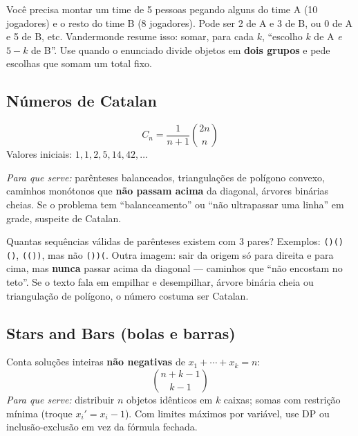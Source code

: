 \begin{exemplodiabox}
Você precisa montar um time de 5 pessoas pegando alguns do time A (10 jogadores) e o resto do time B (8 jogadores). Pode ser 2 de A e 3 de B, ou 0 de A e 5 de B, etc. Vandermonde resume isso: somar, para cada $k$, ``escolho $k$ de A \emph{e} $5-k$ de B''. Use quando o enunciado divide objetos em \textbf{dois grupos} e pede escolhas que somam um total fixo.
\end{exemplodiabox}



\subsection{Números de Catalan}

\begin{equation}
  C_n = \frac{1}{n+1}\binom{2n}{n}
\end{equation}
Valores iniciais: $1, 1, 2, 5, 14, 42, \ldots$

\emph{Para que serve:} parênteses balanceados, triangulações de polígono convexo, caminhos monótonos que \textbf{não passam acima} da diagonal, árvores binárias cheias.
Se o problema tem ``balanceamento'' ou ``não ultrapassar uma linha'' em grade, suspeite de Catalan.

\begin{exemplodiabox}
Quantas sequências válidas de parênteses existem com 3 pares? Exemplos: \texttt{()()()}, \texttt{(())}, mas não \texttt{())(}. Outra imagem: sair da origem só para direita e para cima, mas \textbf{nunca} passar acima da diagonal --- caminhos que ``não encostam no teto''. Se o texto fala em empilhar e desempilhar, árvore binária cheia ou triangulação de polígono, o número costuma ser Catalan.
\end{exemplodiabox}



\subsection{Stars and Bars (bolas e barras)}

Conta soluções inteiras \textbf{não negativas} de $x_1 + \cdots + x_k = n$:
\begin{equation}
  \binom{n + k - 1}{k - 1}
\end{equation}
\emph{Para que serve:} distribuir $n$ objetos idênticos em $k$ caixas; somas com restrição mínima (troque $x_i' = x_i - 1$).
Com limites máximos por variável, use DP ou inclusão-exclusão em vez da fórmula fechada.

